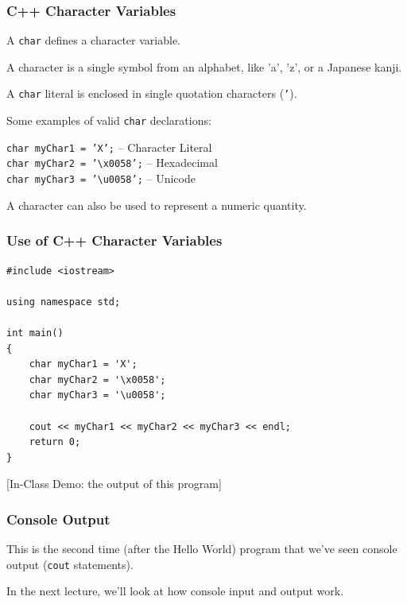 \begin{frame}
\frametitle{C++ Character Variables}

A \texttt{char} defines a character variable.

A character is a single symbol from an alphabet, like 'a', 'z', or a Japanese kanji.

A \texttt{char} literal is enclosed in single quotation characters (\texttt{'}).

Some examples of valid \texttt{char} declarations:

\texttt{char myChar1 = 'X';}  -- Character Literal\\
\texttt{char myChar2 = '\textbackslash x0058';} -- Hexadecimal\\
\texttt{char myChar3 = '\textbackslash u0058';} -- Unicode

A character can also be used to represent a numeric quantity.

\end{frame}

\begin{frame}[fragile]
\frametitle{Use of C++ Character Variables}

\begin{verbatim}
#include <iostream>

using namespace std;

int main()
{
    char myChar1 = 'X';
    char myChar2 = '\x0058';
    char myChar3 = '\u0058';

    cout << myChar1 << myChar2 << myChar3 << endl;
    return 0;
}
\end{verbatim}


[In-Class Demo: the output of this program]

\end{frame}

\begin{frame}
\frametitle{Console Output}

This is the second time (after the Hello World) program that we've seen console output (\texttt{cout} statements).

In the next lecture, we'll look at how console input and output work.

\end{frame}



